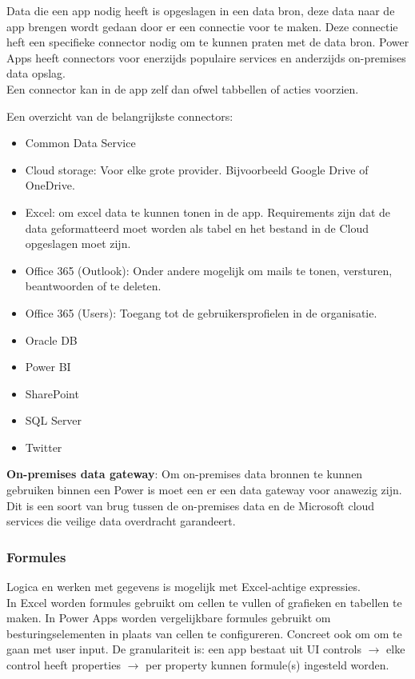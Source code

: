 Data die een app nodig heeft is opgeslagen in een data bron, deze data naar de app brengen wordt gedaan door er een connectie voor te maken. Deze connectie heft een specifieke connector nodig om te kunnen praten met de data bron. Power Apps heeft connectors voor enerzijds populaire services en anderzijds on-premises data opslag. \\
Een connector kan in de app zelf dan ofwel tabbellen of acties voorzien.

Een overzicht van de belangrijkste connectors:
\begin{itemize}
    \item Common Data Service
    \item Cloud storage: Voor elke grote provider. Bijvoorbeeld Google Drive of OneDrive.
    \item Excel: om excel data te kunnen tonen in de app. Requirements zijn dat de data geformatteerd moet worden als tabel en het bestand in de Cloud opgeslagen moet zijn.
    \item Office 365 (Outlook): Onder andere mogelijk om mails te tonen, versturen, beantwoorden of te deleten.
    \item Office 365 (Users): Toegang tot de gebruikersprofielen in de organisatie.
    \item Oracle DB
    \item Power BI
    \item SharePoint
    \item SQL Server
    \item Twitter
\end{itemize}

\textbf{On-premises data gateway}: Om on-premises data bronnen te kunnen gebruiken binnen een Power is moet een er een data gateway voor anawezig zijn. Dit is een soort van brug tussen de on-premises data en de Microsoft cloud services die veilige data overdracht garandeert.

\subsubsection{Formules}


Logica en werken met gegevens is mogelijk met Excel-achtige expressies.\\
In Excel worden formules gebruikt om cellen te vullen of grafieken en tabellen te maken. In Power Apps worden vergelijkbare formules gebruikt om besturingselementen in plaats van cellen te configureren. Concreet ook om om te gaan met user input. De granulariteit is: een app bestaat uit UI controls $\rightarrow$ elke control heeft properties $\rightarrow$ per property kunnen formule(s) ingesteld worden.

